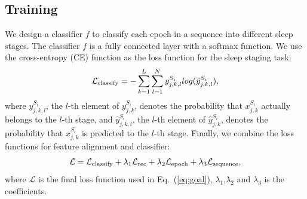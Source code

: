 \documentclass[letterpaper]{article} %
\begin{document}
	\subsection{Training}


	We design a classifier $f$ to classify each epoch in a sequence into different sleep stages. The classifier $f$ is a fully connected layer with a softmax function.
	We use the cross-entropy (CE) function as the loss function for the sleep staging task:
	\begin{equation}
		\label{eq:classify}
		\small
		\mathcal L_{\mathrm{classify}} =-\sum^{L}_{k=1} \sum^{N}_{l=1} y^{S_i}_{j, k, l}log(\hat{y}^{S_i}_{j, k, l}),
	\end{equation}
	where $y^{S_i}_{j, k, l}$, the $l$-th element of $y^{S_i}_{j, k}$, denotes the probability that $x^{S_i}_{j, k}$ actually belongs to the $l$-th stage, and $\hat{y}^{S_i}_{j, k, l}$, the $l$-th element of $\hat{y}^{S_i}_{j, k}$, denotes the probability that $x^{S_i}_{j, k}$ is predicted to the $l$-th stage.
	Finally, we combine the loss functions for feature alignment and classifier:
	\begin{equation}
		\label{eq:loss}
		\small
		\mathcal L = \mathcal L_{\mathrm{classify}} + \lambda_1 \mathcal{L}_{\mathrm{rec}} + \lambda_2 \mathcal{L}_{\mathrm{epoch}} + \lambda_3 \mathcal{L}_{\mathrm{sequence}},
	\end{equation}
	where $\mathcal L$ is the final loss function used in Eq.~(\ref{eq:goal}), $\lambda_1$,$\lambda_2$ and $\lambda_3$ is the coefficients.
\end{document}
